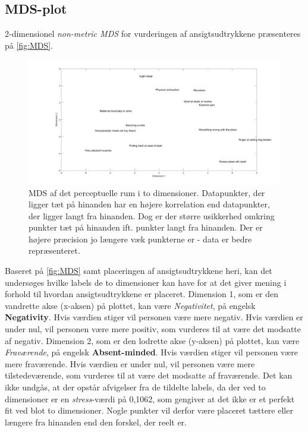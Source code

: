 \subsection*{MDS-plot}
2-dimensionel \textit{non-metric MDS} for vurderingen af ansigtsudtrykkene præsenteres på \autoref{fig:MDS}.  
%
\begin{figure}[H]
\centering
\includegraphics[width =\textwidth]{Figure/MDS_plot} 
\caption{MDS af det perceptuelle rum i to dimensioner. Datapunkter, der ligger tæt på hinanden har en højere korrelation end datapunkter, der ligger langt fra hinanden. Dog er der større usikkerhed omkring punkter tæt på hinanden ift. punkter langt fra hinanden. Der er højere præcision jo længere væk punkterne er - data er bedre repræsenteret.}
\label{fig:MDS}
\end{figure}
%
Baseret på \autoref{fig:MDS} samt placeringen af ansigtsudtrykkene heri, kan det undersøges hvilke labels de to dimensioner kan have for at det giver mening i forhold til hvordan ansigtsudtrykkene er placeret.\blankline 
%
Dimension 1, som er den vandrette akse (x-aksen) på plottet, kan være \textit{Negativitet}, på engelsk \textbf{Negativity}. Hvis værdien stiger vil personen være mere negativ. Hvis værdien er under nul, vil personen være mere positiv, som vurderes til at være det modsatte af negativ.\blankline
%
Dimension 2, som er den lodrette akse (y-aksen) på plottet, kan være \textit{Fraværende}, på engelsk \textbf{Absent-minded}. Hvis værdien stiger vil personen være mere fraværende. Hvis værdien er under nul, vil personen være mere tilstedeværende, som vurderes til at være det modsatte af fraværende. \blankline
%
Det kan ikke undgås, at der opstår afvigelser fra de tildelte labels, da der ved to dimensioner er en \textit{stress}-værdi på 0,1062, som gengiver at det ikke er et perfekt fit ved blot to dimensioner. Nogle punkter vil derfor være placeret tættere eller længere fra hinanden end den forskel, der reelt er.\blankline
